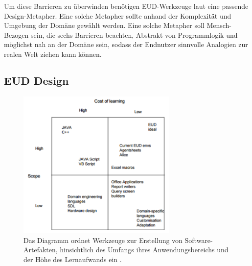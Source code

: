 Um diese Barrieren zu überwinden benötigen \ac{EUD}-Werkzeuge laut \cite{ko2004six} eine passende Design-Metapher. Eine solche Metapher sollte anhand der Komplexität und Umgebung der Domäne gewählt werden. Eine solche Metapher soll Mensch-Bezogen sein, die sechs Barrieren beachten, Abstrakt von Programmlogik und möglichst nah an der Domäne sein, sodass der Endnutzer sinnvolle Analogien zur realen Welt ziehen kann können. 

\subsection{EUD Design}\label{sec:loesungsans}
\begin{figure}[H]
    \centering
    \includegraphics[width=0.7\textwidth]{bilder/chapter2/eudmatrix.png}
    \caption{Das Diagramm ordnet Werkzeuge zur Erstellung von Software-Artefakten, hinsichtlich des Umfangs ihres Anwendungsbereichs und der Höhe des Lernaufwands ein \cite{fischer2004meta}.}
    \label{fig:kompvslern}
\end{figure}

